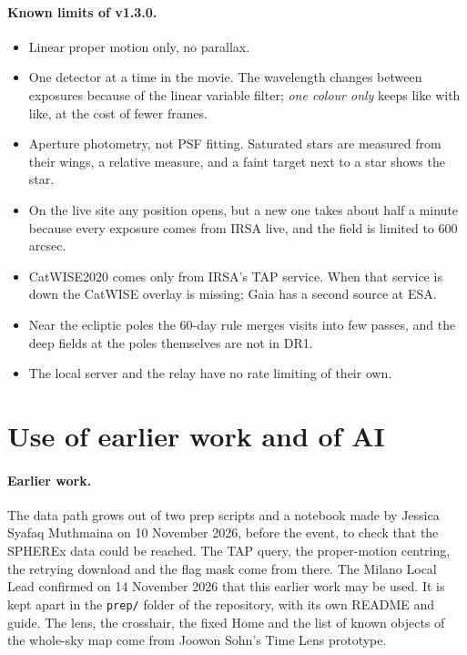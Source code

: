 \documentclass[11pt,a4paper]{article}
\newcommand{\Version}{v1.3.0}
\begin{document}
\paragraph{Known limits of \Version.}
\begin{itemize}
  \item Linear proper motion only, no parallax.
  \item One detector at a time in the movie. The wavelength changes between exposures because of
        the linear variable filter; \emph{one colour only} keeps like with like, at the cost of
        fewer frames.
  \item Aperture photometry, not PSF fitting. Saturated stars are measured from their wings, a
        relative measure, and a faint target next to a star shows the star.
  \item On the live site any position opens, but a new one takes about half a minute because
        every exposure comes from IRSA live, and the field is limited to 600 arcsec.
  \item CatWISE2020 comes only from IRSA's TAP service. When that service is down the CatWISE
        overlay is missing; Gaia has a second source at ESA.
  \item Near the ecliptic poles the 60-day rule merges visits into few passes, and the deep
        fields at the poles themselves are not in DR1.
  \item The local server and the relay have no rate limiting of their own.
\end{itemize}

\section{Use of earlier work and of AI}

\paragraph{Earlier work.} The data path grows out of two prep scripts and a notebook made by
Jessica Syafaq Muthmaina on 10 November 2026, before the event, to check that the SPHEREx data
could be reached. The TAP query, the proper-motion centring, the retrying download and the flag
mask come from there. The Milano Local Lead confirmed on 14 November 2026 that this earlier work
may be used. It is kept apart in the \texttt{prep/} folder of the repository, with its own README
and guide. The lens, the crosshair, the fixed Home and the list of known objects of the whole-sky map come
from Joowon Sohn's Time Lens prototype.
\end{document}
